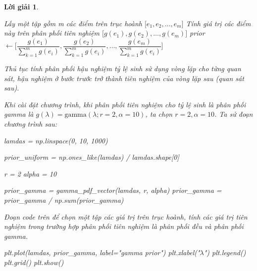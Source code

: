 \documentclass[14pt, a4paper]{article}
\theoremstyle{sltheorem}
\theoremstyle{soltheorem}
\newtheorem*{loigiai}{Lời giải}
\begin{document}
\begin{loigiai}
\begin{enumerate}
        \begin{algorithm}[h!]
            \DontPrintSemicolon
            Lấy một tập gồm m các điểm trên trục hoành $\lbrack e_1, e_2, \dots, e_m \rbrack$\;
            Tính giá trị các điểm này trên phân phối tiên nghiệm $\lbrack g(e_1), g(e_2), \dots, g(e_m) \rbrack$\;
            prior $\gets \Big \lbrack \dfrac{g(e_1)}{\sum_{k=1}^m g(e_i)}, \dfrac{g(e_2)}{\sum_{k=1}^m g(e_i)}, \dots, \dfrac{g(e_m)}{\sum_{k=1}^m g(e_i)} \Big \rbrack$\;
            \;
            \caption{Thủ tục tính phân phối hậu nghiệm tỷ lệ sinh sử dụng vòng lặp cho từng quan sát, hậu nghiệm ở bước trước trở thành tiên nghiệm của vòng lặp sau (quan sát sau).}
        \end{algorithm}

        Khi cài đặt chương trình, khi phân phối tiên nghiệm cho tỷ lệ sinh là phân phối gamma là $g(\lambda) = \text{gamma}(\lambda; r=2, \alpha=10)$, ta chọn $r=2, \alpha=10$.
        Ta sử đoạn chương trình sau:

        \begin{python}
lamdas = np.linspace(0, 10, 1000)

prior_uniform = np.ones_like(lamdas) / lamdas.shape[0]
            
r = 2
alpha = 10
            
prior_gamma = gamma_pdf_vector(lamdas, r, alpha)
prior_gamma = prior_gamma / np.sum(prior_gamma)
        \end{python}

        Đoạn code trên để chọn một tập các giá trị trên trục hoành, tính các giá trị tiên nghiệm trong trường hợp phân phối tiên nghiệm là phân phối đều và phân phối gamma.

        \begin{python}
plt.plot(lamdas, prior_gamma, label="gamma prior")
plt.xlabel("$\lambda$")
plt.legend()
plt.grid()
plt.show()
        \end{python}


\end{enumerate}
\end{loigiai}
\end{document}
